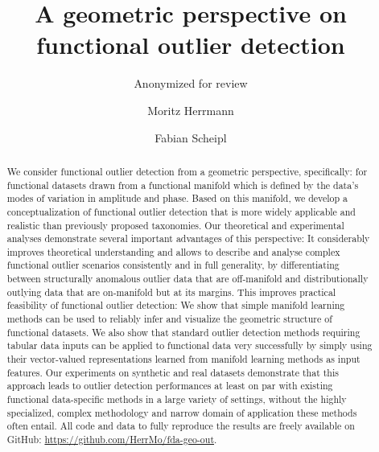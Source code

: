 \title{A geometric perspective on functional outlier detection}

%

\author{Anonymized for review}
\author{Moritz Herrmann \and Fabian Scheipl}



\maketitle

\begin{abstract}
We consider functional outlier detection from a geometric perspective, specifically: for functional datasets drawn from a functional manifold which is defined by the data's modes of variation in amplitude and phase.
Based on this manifold, we develop a conceptualization of functional outlier detection that is more widely applicable and realistic than previously proposed taxonomies.
Our theoretical and experimental analyses demonstrate several important advantages of this perspective:
It considerably improves theoretical understanding and allows to describe and analyse complex functional outlier scenarios consistently and in full generality, by differentiating between structurally anomalous outlier data that are off-manifold and distributionally outlying data that are on-manifold but at its margins.
This improves practical feasibility of functional outlier detection: We show that simple manifold learning methods can be used to reliably infer and visualize the geometric structure of functional datasets.
We also show that standard outlier detection methods requiring tabular data inputs can be applied to functional data very successfully by simply using their vector-valued representations learned from manifold learning methods as input features.
Our experiments on synthetic and real datasets demonstrate that this approach leads to outlier detection performances at least on par with existing functional data-specific methods in a large variety of settings, without the highly specialized, complex methodology and narrow domain of application these methods often entail. All code and data to fully reproduce the results are freely available on GitHub: \url{https://github.com/HerrMo/fda-geo-out}.
\end{abstract}
